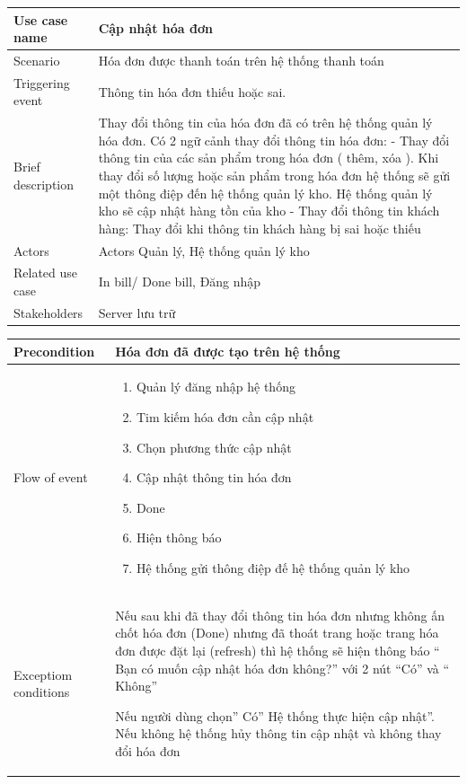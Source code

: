 \documentclass{article}
\begin{document}
\begin{tabular}{|m{4cm}|m{12cm}|}
		\hline
		Use case name & Cập nhật hóa đơn\\
		\hline
		Scenario & Hóa đơn được thanh toán trên hệ thống thanh toán \\
		\hline
		Triggering event & Thông tin hóa đơn thiếu hoặc sai. \\
		\hline
		Brief description & Thay đổi thông tin của hóa đơn đã có trên hệ thống quản lý hóa đơn. Có 2 ngữ cảnh thay đổi thông tin hóa đơn: 
-	Thay đổi thông tin của các sản phẩm trong hóa đơn ( thêm, xóa ). Khi thay đổi số lượng hoặc sản phẩm trong hóa đơn hệ thống sẽ gửi một thông điệp đến hệ thống quản lý kho. Hệ thống quản lý kho sẽ cập nhật hàng tồn của kho
-	Thay đổi thông tin khách hàng: Thay đổi khi thông tin khách hàng bị sai hoặc thiếu\\
		\hline
		 Actors &  Actors	Quản lý, Hệ thống quản lý kho\\
		\hline
		Related use case & In bill/ Done bill, Đăng nhập\\
		\hline
		Stakeholders & Server lưu trữ\\
		\hline
	\end{tabular}
    
    \begin{tabular}{|m{4cm}|m{12cm}|}
        \hline
		Precondition & Hóa đơn đã được tạo trên hệ thống\\
		\hline
		Flow of event & 
			\begin{enumerate}
				\item Quản lý đăng nhập hệ thống 
				\item Tim kiếm hóa đơn cần cập nhật 
				\item Chọn phương thức cập nhật 
				\item Cập nhật thông tin hóa đơn
				\item Done
				\item Hiện thông báo
				\item Hệ thống gửi thông điệp đế hệ thống quản lý kho
 
			\end{enumerate}\\
		\hline
		Exceptiom conditions & Nếu sau khi đã thay đổi thông tin hóa đơn nhưng không ấn chốt hóa đơn (Done) nhưng đã thoát trang hoặc trang hóa đơn được đặt lại (refresh)  thì hệ thống sẽ hiện thông báo “ Bạn có muốn cập nhật hóa đơn không?” với 2 nút “Có” và “ Không”
		
Nếu người dùng chọn” Có” Hệ thống thực hiện cập nhật”. Nếu không hệ thống hủy thông tin cập nhật và không thay đổi hóa đơn 
 \\
		\hline
    \end{tabular}
	
\end{document}
